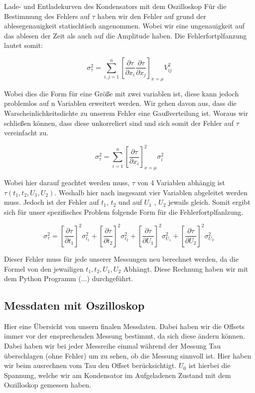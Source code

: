 \documentclass[twoside]{protokoll}
\begin{document}
\begin{aufgabe}{Lade- und Entladekurven des Kondensators mit dem Oszilloskop}
Für die Bestimmung des Fehlers auf $\tau$ haben wir den Fehler auf grund der ablesegenauigkeit statischtisch angenommen. Wobei wir eine ungenauigkeit auf das ablesen der Zeit als auch auf die Amplitude haben. Die Fehlerfortplfanzung lautet somit: 

\begin{equation}
	\sigma_{\tau}^2 = \sum_{i,j=1}^n\left[\frac{\partial \tau}{\partial x_i}\frac{\partial \tau}{\partial x_j}\right]_{x=\mu}V_{ij}^2
\end{equation}

Wobei dies die Form für eine Größe mit zwei variablen ist, diese kann jedoch problemlos auf n Variablen erweitert werden.
Wir gehen davon aus, dass die Warscheinlichkeitsdichte zu unserem Fehler eine Gaußverteilung ist.
Woraus wir schließen können, dass diese unkorreliert sind und sich somit der Fehler auf $\tau$ vereinfacht zu. 

\begin{equation}
	\sigma_{\tau}^2 = \sum_{i=1}^n\left[\frac{\partial \tau}{\partial x_i}\right]^2_{x=\mu}\sigma_{i}^2
\end{equation}

Wobei hier darauf geachtet werden muss, $\tau$ von 4 Variablen abhängig ist $\tau\left(t_1, t_2, U_1, U_2\right)$.
Weshalb hier nach insgesamt vier Variablen abgeleitet werden muss. Jedoch ist der Fehler auf $t_1$, $t_2$ und auf $U_1$ , $U_2$ jewails gleich. Somit ergibt sich für unser spezifisches Problem folgende Form für die Fehlerfortplfanlzung. 

\begin{equation}
	\sigma_{\tau}^2 = \left[\frac{\partial \tau}{\partial t_1}\right]^2\sigma_{t_1}^2 + \left[\frac{\partial \tau}{\partial t_2}\right]^2\sigma_{t_2}^2 + \left[\frac{\partial \tau}{\partial U_1}\right]^2\sigma_{U_1}^2 + \left[\frac{\partial \tau}{\partial U_2}\right]^2\sigma_{U_2.}^2
\end{equation}

Dieser Fehler muss für jede unserer Messungen neu berechnet werden, da die Formel von den jewailigen $t_1, t_2, U_1, U_2$ Abhängt. Diese Rechnung haben wir mit dem Python Programm (...) durchgeführt. 

\subsection{Messdaten mit Oszilloskop}
Hier eine Übersicht von unsern finalen Messdaten. Dabei haben wir die Offsets immer vor der ensprechenden Messung bestimmt, da sich diese ändern können.
Dabei haben wir bei jeder Messreihe einmal während der Messung Tau überschlagen (ohne Fehler) um zu sehen, ob die Messung sinnvoll ist.
Hier haben wir beim ausrechnen vom Tau den Offset berücksichtigt.
$U_0$ ist hierbei die Spannung, welche wir am Kondensator im Aufgeladenen Zustand mit dem Oszilloskop gemessen haben.


\end{aufgabe}
\end{document}
